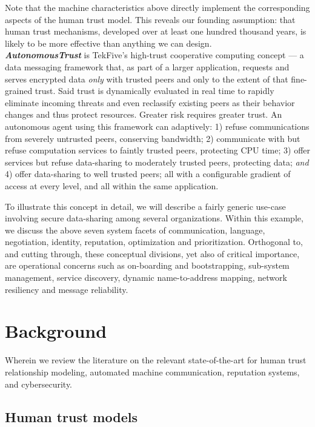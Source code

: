 \documentclass[10pt, twoside]{article}
\newcommand{\projectName}{\emph{AutonomousTrust }}
\begin{document}
Note that the machine characteristics above directly implement the corresponding aspects of the human trust model. This reveals our founding assumption: that human trust mechanisms, developed over at least one hundred thousand years, is likely to be more effective than anything we can design.
\\[10pt]

\textbf{\projectName} is
TekFive's high-trust cooperative computing concept --- a data messaging framework that, as part of a larger application, requests and serves encrypted data \textit{only} with trusted peers and only to the extent of that fine-grained  trust. Said trust is dynamically evaluated in real time to rapidly eliminate incoming threats and even reclassify existing peers as their behavior changes and thus protect resources. Greater risk requires greater trust. An autonomous agent using this framework can adaptively: 1) refuse communications from severely untrusted peers, conserving bandwidth; 2) communicate with but refuse computation services to faintly trusted peers, protecting CPU time; 3) offer services but refuse data-sharing to moderately trusted peers, protecting data; \textit{and} 4) offer data-sharing to well trusted peers; all with a configurable gradient of access at every level, and all within the same application.

To illustrate this concept in detail, we will describe a fairly generic use-case involving secure data-sharing among several organizations. Within this example, we discuss the above seven system facets of communication, language, negotiation, identity, reputation, optimization and prioritization. Orthogonal to, and cutting through, these conceptual divisions, yet also of critical importance, are operational concerns such as on-boarding and bootstrapping, sub-system management, service discovery, dynamic name-to-address mapping, network resiliency and message reliability.


\section{Background}

Wherein we review the literature on the relevant state-of-the-art for human trust relationship modeling, automated machine communication, reputation systems, and cybersecurity.

\subsection{Human trust models} \label{trust}
\end{document}
